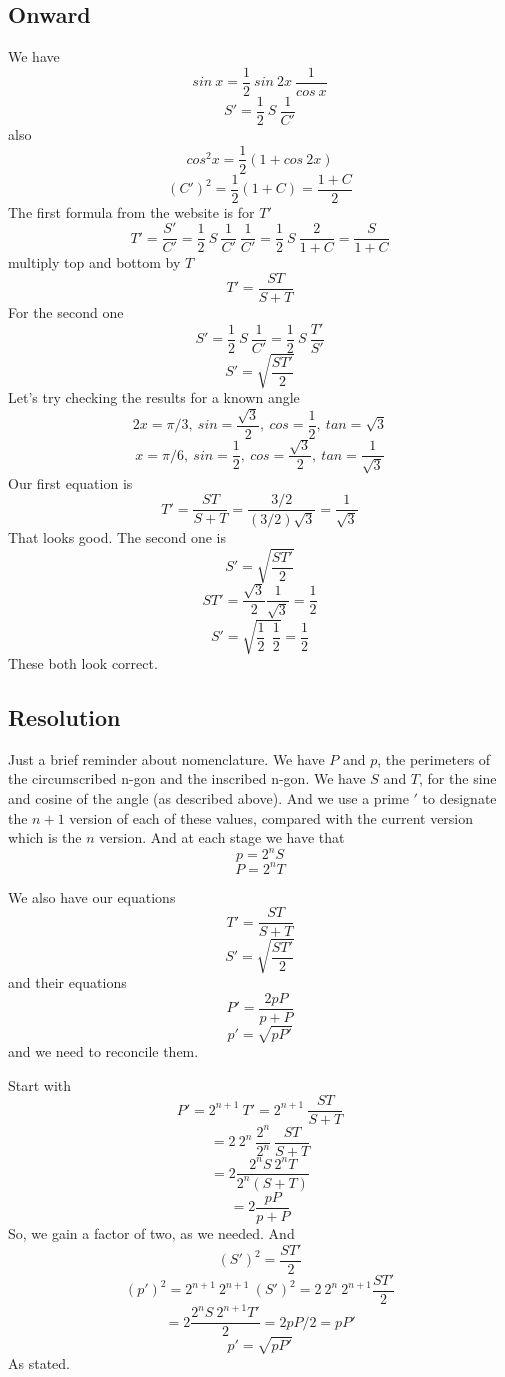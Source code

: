 \documentclass[11pt, oneside]{report}   	%
\begin{document}
\subsection*{Onward}
We have
\[ sin \ x = \frac{1}{2} \ sin \ 2x  \ \frac{1}{cos \ x} \]
\[ S' = \frac{1}{2} \ S \ \frac{1}{C'} \]
also
\[ cos^2x = \frac{1}{2}(1 + cos\ 2x) \]
\[ (C')^2 = \frac{1}{2}(1+C) = \frac{1+C}{2} \]
The first formula from the website is for $T'$
\[ T' = \frac{S'}{C'} = \frac{1}{2} \ S \ \frac{1}{C'} \ \frac{1}{C'} = \frac{1}{2} \ S \ \frac{2}{1+C} =  \frac{S}{1+C}\]
multiply top and bottom by $T$
\begin{equation}
\boxed{ T' =  \frac{ST}{S+T}}
\end{equation}
For the second one
\[ S' = \frac{1}{2} \ S \ \frac{1}{C'} =  \frac{1}{2} \ S \ \frac{T'}{S'} \]
\begin{equation}
\boxed{ S' = \sqrt{\frac{ST'}{2}}}
\end{equation}
Let's try checking the results for a known angle
\[ 2x = \pi/3, \ sin = \frac{\sqrt{3}}{2}, \ cos = \frac{1}{2}, \ tan = \sqrt{3} \]
\[ x = \pi/6, \ sin = \frac{1}{2}, \ cos = \frac{\sqrt{3}}{2}, \ tan = \frac{1}{\sqrt{3}} \]
Our first equation is
\[ T' =  \frac{ST}{S+T} = \frac{3/2}{(3/2)\sqrt{3}} = \frac{1}{\sqrt{3}} \]
That looks good.  The second one is
\[ S' = \sqrt{\frac{ST'}{2}} \]
\[ ST' = \frac{\sqrt{3}}{2} \frac{1}{\sqrt{3}} = \frac{1}{2} \]
\[ S' = \sqrt{ \frac{1}{2}\ \ \frac{1}{2}} = \frac{1}{2} \]
These both look correct.
\subsection*{Resolution}
Just a brief reminder about nomenclature.  We have $P$ and $p$, the perimeters of the circumscribed n-gon and the inscribed n-gon.  We have $S$ and $T$, for the sine and cosine of the angle (as described above).  And we use a prime $'$ to designate the $n+1$ version of each of these values, compared with the current version which is the $n$ version.  And at each stage we have that 
\[ p = 2^n S \]
\[ P = 2^n T \]

We also have our equations 
\[ T' =  \frac{ST}{S+T} \]
\[ S' = \sqrt{\frac{ST'}{2}} \]
and their equations
\[ P' = \frac{2pP}{p + P} \]
\[ p' = \sqrt{pP'} \]
and we need to reconcile them.

Start with
\[ P' =  2^{n+1} \ T'= 2^{n+1} \ \frac{ST}{S+T} \]
\[ = 2 \ 2^{n} \ \frac{2^n}{2^n} \ \frac{ST}{S+T} \]
\[ = 2 \frac{2^nS \ 2^n T}{2^n (S + T)}\]
\[ = 2 \frac{pP}{p + P}\]
So, we gain a factor of two, as we needed.  And
\[ (S')^2 = \frac{ST'}{2} \]
\[ (p')^2 = 2^{n+1} \ 2^{n+1} \ (S')^2 = 2 \ 2^n \ 2^{n+1} \frac{ST'}{2} \]
\[ = 2 \frac{2^n S \ 2^{n+1}T'}{2} =  2 p P / 2 = p P' \]
\[ p' = \sqrt{p P'} \]
As stated.
\end{document}
